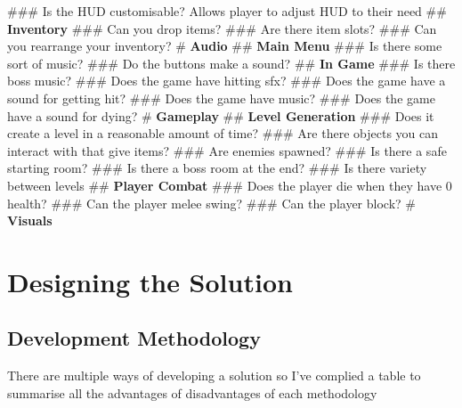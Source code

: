 \documentclass{article}
\newcommand{\smallBr}{\vspace{1.5mm}}
\begin{document}
\begin{easylist}
### Is the HUD customisable? \linebreak
Allows player to adjust HUD to their need \smallBr
## \textbf{Inventory}
### Can you drop items?
### Are there item slots?
### Can you rearrange your inventory?
# \large{\textbf{Audio}}
## \textbf{Main Menu}
### Is there some sort of music?
### Do the buttons make a sound?
## \textbf{In Game}
### Is there boss music?
### Does the game have hitting sfx?
### Does the game have a sound for getting hit?
### Does the game have music?
### Does the game have a sound for dying?
# \large{\textbf{Gameplay}}
## \textbf{Level Generation}
### Does it create a level in a reasonable amount of time?
### Are there objects you can interact with that give items?
### Are enemies spawned?
### Is there a safe starting room?
### Is there a boss room at the end?
### Is there variety between levels
## \textbf{Player Combat}
### Does the player die when they have 0 health?
### Can the player melee swing?
### Can the player block?
# \large{\textbf{Visuals}}
\end{easylist}

\section{Designing the Solution}
\subsection{Development Methodology}
There are multiple ways of developing a solution so I've complied a table to summarise all the advantages of disadvantages of each methodology

\pagebreak
\end{document}
